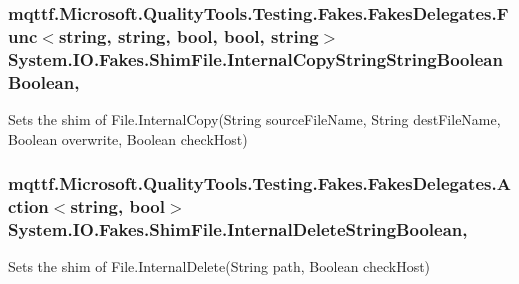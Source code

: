 \hypertarget{class_system_1_1_i_o_1_1_fakes_1_1_shim_file_a4213280e70282b06e00d8146997d1ef0}{
\subsubsection[{Internal\-Copy\-String\-String\-Boolean\-Boolean}]{\setlength{\rightskip}{0pt plus 5cm}mqttf.\-Microsoft.\-Quality\-Tools.\-Testing.\-Fakes.\-Fakes\-Delegates.\-Func$<$string, string, bool, bool, string$>$ System.\-I\-O.\-Fakes.\-Shim\-File.\-Internal\-Copy\-String\-String\-Boolean\-Boolean\hspace{0.3cm}{\ttfamily [static]}, {\ttfamily [set]}}}\label{class_system_1_1_i_o_1_1_fakes_1_1_shim_file_a4213280e70282b06e00d8146997d1ef0}


Sets the shim of File.\-Internal\-Copy(\-String source\-File\-Name, String dest\-File\-Name, Boolean overwrite, Boolean check\-Host)

\hypertarget{class_system_1_1_i_o_1_1_fakes_1_1_shim_file_adbe282618bf51c93693920b8accaca19}{
\subsubsection[{Internal\-Delete\-String\-Boolean}]{\setlength{\rightskip}{0pt plus 5cm}mqttf.\-Microsoft.\-Quality\-Tools.\-Testing.\-Fakes.\-Fakes\-Delegates.\-Action$<$string, bool$>$ System.\-I\-O.\-Fakes.\-Shim\-File.\-Internal\-Delete\-String\-Boolean\hspace{0.3cm}{\ttfamily [static]}, {\ttfamily [set]}}}\label{class_system_1_1_i_o_1_1_fakes_1_1_shim_file_adbe282618bf51c93693920b8accaca19}


Sets the shim of File.\-Internal\-Delete(\-String path, Boolean check\-Host)

